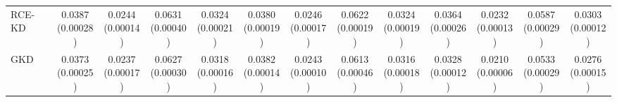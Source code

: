 \begin{table}[t]
\begin{tabular}{lcccccccccccc}
RCE-KD & \shortstack[c]{0.0387\\[-1pt]{\tiny(0.00028)}} & \shortstack[c]{0.0244\\[-1pt]{\tiny(0.00014)}} & \shortstack[c]{0.0631\\[-1pt]{\tiny(0.00040)}} & \shortstack[c]{0.0324\\[-1pt]{\tiny(0.00021)}} & \shortstack[c]{0.0380\\[-1pt]{\tiny(0.00019)}} & \shortstack[c]{0.0246\\[-1pt]{\tiny(0.00017)}} & \shortstack[c]{0.0622\\[-1pt]{\tiny(0.00019)}} & \shortstack[c]{0.0324\\[-1pt]{\tiny(0.00019)}} & \shortstack[c]{0.0364\\[-1pt]{\tiny(0.00026)}} & \shortstack[c]{0.0232\\[-1pt]{\tiny(0.00013)}} & \shortstack[c]{0.0587\\[-1pt]{\tiny(0.00029)}} & \shortstack[c]{0.0303\\[-1pt]{\tiny(0.00012)}} \\
GKD & \shortstack[c]{0.0373\\[-1pt]{\tiny(0.00025)}} & \shortstack[c]{0.0237\\[-1pt]{\tiny(0.00017)}} & \shortstack[c]{0.0627\\[-1pt]{\tiny(0.00030)}} & \shortstack[c]{0.0318\\[-1pt]{\tiny(0.00016)}} & \shortstack[c]{0.0382\\[-1pt]{\tiny(0.00014)}} & \shortstack[c]{0.0243\\[-1pt]{\tiny(0.00010)}} & \shortstack[c]{0.0613\\[-1pt]{\tiny(0.00046)}} & \shortstack[c]{0.0316\\[-1pt]{\tiny(0.00018)}} & \shortstack[c]{0.0328\\[-1pt]{\tiny(0.00012)}} & \shortstack[c]{0.0210\\[-1pt]{\tiny(0.00006)}} & \shortstack[c]{0.0533\\[-1pt]{\tiny(0.00029)}} & \shortstack[c]{0.0276\\[-1pt]{\tiny(0.00015)}} \\

\end{tabular}
\end{table}
